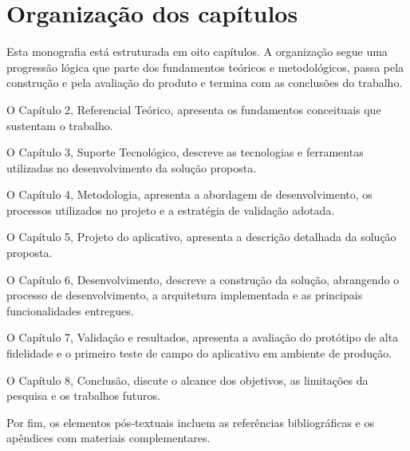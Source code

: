\section{Organização dos capítulos}

  Esta monografia está estruturada em oito capítulos. A organização segue uma progressão lógica que parte dos fundamentos teóricos e metodológicos, passa pela construção e pela avaliação do produto e termina com as conclusões do trabalho.

  O Capítulo 2, Referencial Teórico, apresenta os fundamentos conceituais que sustentam o trabalho.

  O Capítulo 3, Suporte Tecnológico, descreve as tecnologias e ferramentas utilizadas no desenvolvimento da solução proposta.

  O Capítulo 4, Metodologia, apresenta a abordagem de desenvolvimento, os processos utilizados no projeto e a estratégia de validação adotada.

  O Capítulo 5, Projeto do aplicativo, apresenta a descrição detalhada da solução proposta.

  O Capítulo 6, Desenvolvimento, descreve a construção da solução, abrangendo o processo de desenvolvimento, a arquitetura implementada e as principais funcionalidades entregues.

  O Capítulo 7, Validação e resultados, apresenta a avaliação do protótipo de alta fidelidade e o primeiro teste de campo do aplicativo em ambiente de produção.

  O Capítulo 8, Conclusão, discute o alcance dos objetivos, as limitações da pesquisa e os trabalhos futuros.

  Por fim, os elementos pós-textuais incluem as referências bibliográficas e os apêndices com materiais complementares.
